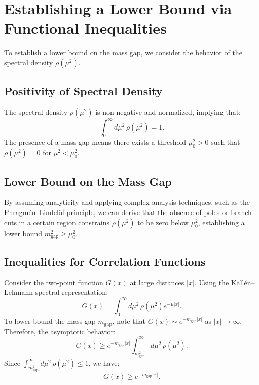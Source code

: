 \section{Establishing a Lower Bound via Functional Inequalities}

To establish a lower bound on the mass gap, we consider the behavior of the spectral density \(\rho(\mu^2)\).

\subsection{Positivity of Spectral Density}

The spectral density \(\rho(\mu^2)\) is non-negative and normalized, implying that:
\begin{equation}
\int_0^\infty d\mu^2 \, \rho(\mu^2) = 1.
\end{equation}
The presence of a mass gap means there exists a threshold \(\mu_0^2 > 0\) such that \(\rho(\mu^2) = 0\) for \(\mu^2 < \mu_0^2\).

\subsection{Lower Bound on the Mass Gap}

By assuming analyticity and applying complex analysis techniques, such as the Phragmén–Lindelöf principle, we can derive that the absence of poles or branch cuts in a certain region constrains \(\rho(\mu^2)\) to be zero below \(\mu_0^2\), establishing a lower bound \(m_{\text{gap}}^2 \geq \mu_0^2\).

\subsection{Inequalities for Correlation Functions}

Consider the two-point function \(G(x)\) at large distances \(|x|\). Using the Källén–Lehmann spectral representation:
\begin{equation}
G(x) = \int_0^\infty d\mu^2 \, \rho(\mu^2) e^{-\mu |x|}.
\end{equation}
To lower bound the mass gap \(m_{\text{gap}}\), note that \(G(x) \sim e^{-m_{\text{gap}} |x|}\) as \(|x| \to \infty\). Therefore, the asymptotic behavior:
\begin{equation}
G(x) \geq e^{-m_{\text{gap}} |x|} \int_{m_{\text{gap}}^2}^\infty d\mu^2 \, \rho(\mu^2).
\end{equation}
Since \(\int_{m_{\text{gap}}^2}^\infty d\mu^2 \, \rho(\mu^2) \leq 1\), we have:
\begin{equation}
G(x) \geq e^{-m_{\text{gap}} |x|}.
\end{equation}



